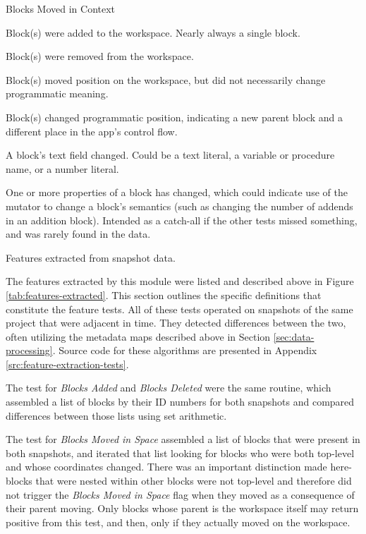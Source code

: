 \begin{table}
\begin{labeling}{Blocks Moved in Context}

	\item [Blocks Added] Block(s) were added to the workspace. Nearly always a single block.
	\item [Blocks Deleted] Block(s) were removed from the workspace.
	\item [Blocks Moved in Space] Block(s) moved position on the workspace, but did not necessarily change programmatic meaning.
	\item [Blocks Moved in Context] Block(s) changed programmatic position, indicating a new parent block and a different place in the app's control flow.
	\item [Fields Changed] A block's text field changed. Could be a text literal, a variable or procedure name, or a number literal.
	\item [Properties Modified] One or more properties of a block has changed, which could indicate use of the mutator to change a block's semantics (such as changing the number of addends in an addition block). Intended as a catch-all if the other tests missed something, and was rarely found in the data.
	
\end{labeling}
\caption[Features extracted from snapshots]{Features extracted from snapshot data.}
\label{tab:features-extracted}
\end{table}

The features extracted by this module were listed and described above in Figure \ref{tab:features-extracted}. This section outlines the specific definitions that constitute the feature tests. All of these tests operated on snapshots of the same project that were adjacent in time. They detected differences between the two, often utilizing the metadata maps described above in Section \ref{sec:data-processing}. Source code for these algorithms are presented in Appendix \ref{src:feature-extraction-tests}.

The test for \emph{Blocks Added} and \emph{Blocks Deleted} were the same routine, which assembled a list of blocks by their ID numbers for both snapshots and compared differences between those lists using set arithmetic. 

The test for \emph{Blocks Moved in Space} assembled a list of blocks that were present in both snapshots, and iterated that list looking for blocks who were both top-level and whose coordinates changed. There was an important distinction made here- blocks that were nested within other blocks were not top-level and therefore did not trigger the \emph{Blocks Moved in Space} flag when they moved as a consequence of their parent moving. Only blocks whose parent is the workspace itself may return positive from this test, and then, only if they actually moved on the workspace.

